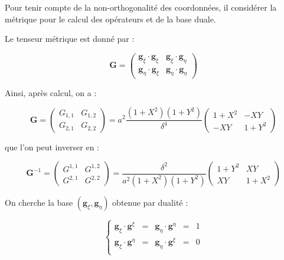 Pour tenir compte de la non-orthogonalité des coordonnées, il considérer la métrique pour le calcul des opérateurs et de la base duale.

Le tenseur métrique est donné par :

\begin{equation}
\mathbf{G} = \begin{pmatrix}
\mathbf{g}_{\xi} \cdot \mathbf{g}_{\xi} & \mathbf{g}_{\xi} \cdot \mathbf{g}_{\eta} \\
\mathbf{g}_{\eta} \cdot \mathbf{g}_{\xi} & \mathbf{g}_{\eta} \cdot \mathbf{g}_{\eta}
\end{pmatrix}
\label{eq: metrique}
\end{equation}

Ainsi, après calcul, on a :

\begin{equation}
\mathbf{G} = \begin{pmatrix}
G_{1,1} & G_{1,2} \\ G_{2,1} & G_{2,2}
\end{pmatrix} = a^2 \dfrac{(1+X^2)(1+Y^2)}{\delta^4} \begin{pmatrix}
1+X^2 & -XY \\ -XY & 1+Y^2
\end{pmatrix}
\end{equation}

que l'on peut inverser en :

\begin{equation}
\mathbf{G}^{-1} = \begin{pmatrix}
G^{1,1} & G^{1,2} \\ G^{2,1} & G^{2,2}
\end{pmatrix} = \dfrac{\delta^2}{a^2 (1+X^2)(1+Y^2)} \begin{pmatrix}
1+Y^2 & XY \\ XY & 1+X^2
\end{pmatrix}
\label{eq: metrique inverse}
\end{equation}

On cherche la base $(\mathbf{g}_{\xi},\mathbf{g}_{\eta})$ obtenue par dualité :

\begin{equation}
\left\lbrace
\begin{array}{rcccl}
\mathbf{g}_{\xi} \cdot \mathbf{g}^{\xi} & = & \mathbf{g}_{\eta} \cdot \mathbf{g}^{\eta} & = & 1 \\
\mathbf{g}_{\xi} \cdot \mathbf{g}^{\eta} & = & \mathbf{g}_{\eta} \cdot \mathbf{g}^{\xi} & = & 0 \\
\end{array}
\right.
\end{equation}

